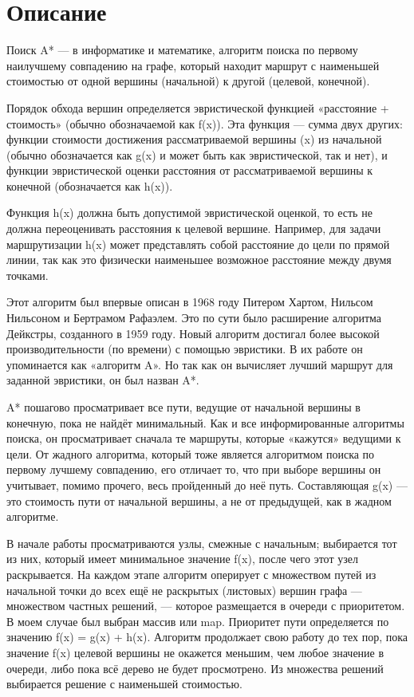 \section{Описание}

Поиск A* — в информатике и математике, алгоритм поиска по первому наилучшему совпадению на графе, который находит маршрут с наименьшей стоимостью от одной вершины (начальной) к другой (целевой, конечной).


Порядок обхода вершин определяется эвристической функцией «расстояние + стоимость» (обычно обозначаемой как f(x)). Эта функция — сумма двух других: функции стоимости достижения рассматриваемой вершины (x) из начальной (обычно обозначается как g(x) и может быть как эвристической, так и нет), и функции эвристической оценки расстояния от рассматриваемой вершины к конечной (обозначается как h(x)).


Функция h(x) должна быть допустимой эвристической оценкой, то есть не должна переоценивать расстояния к целевой вершине. Например, для задачи маршрутизации h(x) может представлять собой расстояние до цели по прямой линии, так как это физически наименьшее возможное расстояние между двумя точками.


Этот алгоритм был впервые описан в 1968 году Питером Хартом, Нильсом Нильсоном и Бертрамом Рафаэлем. Это по сути было расширение алгоритма Дейкстры, созданного в 1959 году. Новый алгоритм достигал более высокой производительности (по времени) с помощью эвристики. В их работе он упоминается как «алгоритм A». Но так как он вычисляет лучший маршрут для заданной эвристики, он был назван A*.


A* пошагово просматривает все пути, ведущие от начальной вершины в конечную, пока не найдёт минимальный. Как и все информированные алгоритмы поиска, он просматривает сначала те маршруты, которые «кажутся» ведущими к цели. От жадного алгоритма, который тоже является алгоритмом поиска по первому лучшему совпадению, его отличает то, что при выборе вершины он учитывает, помимо прочего, весь пройденный до неё путь. Составляющая g(x) — это стоимость пути от начальной вершины, а не от предыдущей, как в жадном алгоритме.


В начале работы просматриваются узлы, смежные с начальным; выбирается тот из них, который имеет минимальное значение f(x), после чего этот узел раскрывается. На каждом этапе алгоритм оперирует с множеством путей из начальной точки до всех ещё не раскрытых (листовых) вершин графа — множеством частных решений, — которое размещается в очереди с приоритетом. В моем случае был выбран массив или map. Приоритет пути определяется по значению f(x) = g(x) + h(x). Алгоритм продолжает свою работу до тех пор, пока значение f(x) целевой вершины не окажется меньшим, чем любое значение в очереди, либо пока всё дерево не будет просмотрено. Из множества решений выбирается решение с наименьшей стоимостью.


